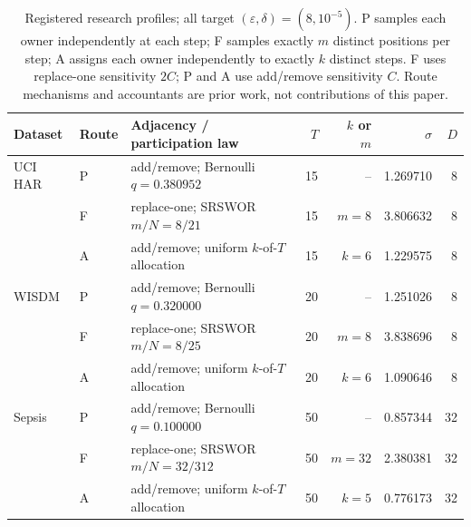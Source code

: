 \begin{table}[t]
\centering
\footnotesize
\setlength{\tabcolsep}{4pt}
\begin{tabular}{@{}lllrrrr@{}}
\toprule
Dataset & Route & Adjacency / participation law & $T$ & $k$ or $m$ & $\sigma$ & $D$ \\
\midrule
UCI HAR & P & add/remove; Bernoulli $q=0.380952$ & 15 & -- & 1.269710 & 8 \\
 & F & replace-one; SRSWOR $m/N=8/21$ & 15 & $m=8$ & 3.806632 & 8 \\
 & A & add/remove; uniform $k$-of-$T$ allocation & 15 & $k=6$ & 1.229575 & 8 \\
\addlinespace[1pt]
WISDM & P & add/remove; Bernoulli $q=0.320000$ & 20 & -- & 1.251026 & 8 \\
 & F & replace-one; SRSWOR $m/N=8/25$ & 20 & $m=8$ & 3.838696 & 8 \\
 & A & add/remove; uniform $k$-of-$T$ allocation & 20 & $k=6$ & 1.090646 & 8 \\
\addlinespace[1pt]
Sepsis & P & add/remove; Bernoulli $q=0.100000$ & 50 & -- & 0.857344 & 32 \\
 & F & replace-one; SRSWOR $m/N=32/312$ & 50 & $m=32$ & 2.380381 & 32 \\
 & A & add/remove; uniform $k$-of-$T$ allocation & 50 & $k=5$ & 0.776173 & 32 \\
\bottomrule
\end{tabular}
\caption{Registered research profiles; all target
$(\varepsilon,\delta)=(8,10^{-5})$.  P samples each owner independently at
each step; F samples exactly $m$ distinct positions per step; A assigns each
owner independently to exactly $k$ distinct steps.  F uses replace-one
sensitivity $2C$; P and A use add/remove sensitivity $C$.  Route mechanisms
and accountants are prior work, not contributions of this paper.}
\label{tab:v38-profiles}
\end{table}
